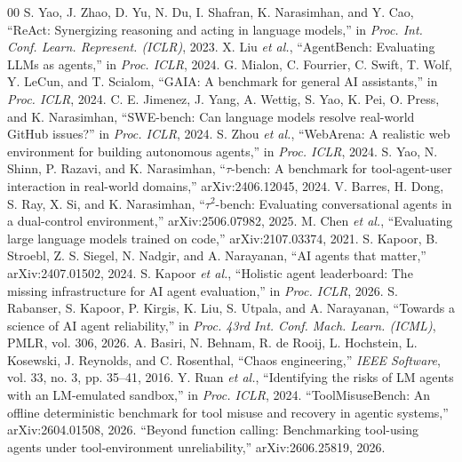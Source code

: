 \documentclass[conference,a4paper]{IEEEtran}
\begin{document}
\begin{thebibliography}{00}
 S. Yao, J. Zhao, D. Yu, N. Du, I. Shafran, K. Narasimhan, and Y. Cao, ``ReAct: Synergizing reasoning and acting in language models,'' in \textit{Proc. Int. Conf. Learn. Represent. (ICLR)}, 2023.
 X. Liu \textit{et al.}, ``AgentBench: Evaluating LLMs as agents,'' in \textit{Proc. ICLR}, 2024.
 G. Mialon, C. Fourrier, C. Swift, T. Wolf, Y. LeCun, and T. Scialom, ``GAIA: A benchmark for general AI assistants,'' in \textit{Proc. ICLR}, 2024.
 C. E. Jimenez, J. Yang, A. Wettig, S. Yao, K. Pei, O. Press, and K. Narasimhan, ``SWE-bench: Can language models resolve real-world GitHub issues?'' in \textit{Proc. ICLR}, 2024.
 S. Zhou \textit{et al.}, ``WebArena: A realistic web environment for building autonomous agents,'' in \textit{Proc. ICLR}, 2024.
 S. Yao, N. Shinn, P. Razavi, and K. Narasimhan, ``$\tau$-bench: A benchmark for tool-agent-user interaction in real-world domains,'' arXiv:2406.12045, 2024.
 V. Barres, H. Dong, S. Ray, X. Si, and K. Narasimhan, ``$\tau^2$-bench: Evaluating conversational agents in a dual-control environment,'' arXiv:2506.07982, 2025.
 M. Chen \textit{et al.}, ``Evaluating large language models trained on code,'' arXiv:2107.03374, 2021.
 S. Kapoor, B. Stroebl, Z. S. Siegel, N. Nadgir, and A. Narayanan, ``AI agents that matter,'' arXiv:2407.01502, 2024.
 S. Kapoor \textit{et al.}, ``Holistic agent leaderboard: The missing infrastructure for AI agent evaluation,'' in \textit{Proc. ICLR}, 2026.
 S. Rabanser, S. Kapoor, P. Kirgis, K. Liu, S. Utpala, and A. Narayanan, ``Towards a science of AI agent reliability,'' in \textit{Proc. 43rd Int. Conf. Mach. Learn. (ICML)}, PMLR, vol. 306, 2026.
 A. Basiri, N. Behnam, R. de Rooij, L. Hochstein, L. Kosewski, J. Reynolds, and C. Rosenthal, ``Chaos engineering,'' \textit{IEEE Software}, vol. 33, no. 3, pp. 35--41, 2016.
 Y. Ruan \textit{et al.}, ``Identifying the risks of LM agents with an LM-emulated sandbox,'' in \textit{Proc. ICLR}, 2024.
 ``ToolMisuseBench: An offline deterministic benchmark for tool misuse and recovery in agentic systems,'' arXiv:2604.01508, 2026.
 ``Beyond function calling: Benchmarking tool-using agents under tool-environment unreliability,'' arXiv:2606.25819, 2026.

\end{thebibliography}
\end{document}
